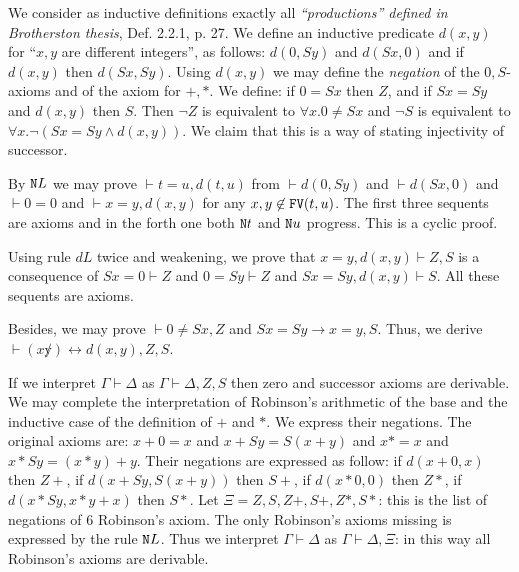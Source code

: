 \documentclass[a4paper,12pt]{article}
\newcommand{\Nat}               { {\tt N}  }
\newcommand{\FV}              { {\tt FV} }
\begin{document}

We consider as inductive definitions exactly all \emph{``productions'' defined in Brotherston thesis}, Def. 2.2.1, p. 27. We define an inductive predicate $d(x,y)$ for ``$x,y$ are different integers'', as follows: $d(0,Sy)$ and $d(Sx,0)$ and if $d(x,y)$ then $d(Sx,Sy)$. Using $d(x,y)$ we may define the \emph{negation} of the $0,S$-axioms and of the axiom for $+,*$. We define: if $0=Sx$ then $Z$, and if $Sx=Sy$ and $d(x,y)$ then $S$. Then $\neg Z$ is equivalent to $\forall x.0\not=Sx$ and $\neg S$ is equivalent to $\forall x. \neg(Sx =Sy \wedge d(x,y))$. We claim that this is a way of stating injectivity of successor. 

By $\Nat L$ we may prove $\vdash t=u, d(t,u)$ from $\vdash d(0,Sy)$ and $\vdash d(Sx,0)$ and $\vdash 0=0$ and $\vdash x=y, d(x,y)$ for any $x, y \not \in \FV(t,u)$. The first three sequents are axioms and in the forth one both $\Nat t$ and $\Nat u$ progress. This is a cyclic proof. 

Using rule $d L$ twice and weakening, we prove that $x=y, d(x,y) \vdash Z,S$ is a consequence of $Sx=0 \vdash Z$ and $0=Sy \vdash Z$ and $Sx=Sy, d(x,y) \vdash S$. All these sequents are axioms.

Besides, we may prove $\vdash 0 \not = Sx, Z$ and $Sx = Sy \rightarrow x=y, S$. Thus, we derive $\vdash (x \not y) \leftrightarrow d(x,y), Z,S$. 

If we interpret $\Gamma \vdash \Delta$ as $\Gamma \vdash \Delta,Z,S$ then zero and successor axioms are derivable. We may complete the interpretation of Robinson's arithmetic of the base and the inductive case of the definition of $+$ and $*$. We express their negations. The original axioms are: $x+0=x$ and $x+Sy=S(x+y)$ and $x*=x$ and $x*Sy=(x*y)+y$. Their negations are expressed as follow: if $d(x+0,x)$ then $Z+$, if $d(x+Sy, S(x+y) )$ then $S+$, if $d(x*0,0)$ then $Z*$, if $d(x*Sy, x*y+x)$ then $S*$.  Let $\Xi = Z,S,Z+,S+,Z*,S*$: this is the list of negations of $6$ Robinson's axiom. The only Robinson's axioms missing is expressed by the rule $\Nat L$.  Thus we interpret $\Gamma \vdash \Delta$ as $\Gamma \vdash \Delta,\Xi$: in this way all Robinson's axioms are derivable.
\end{document}
